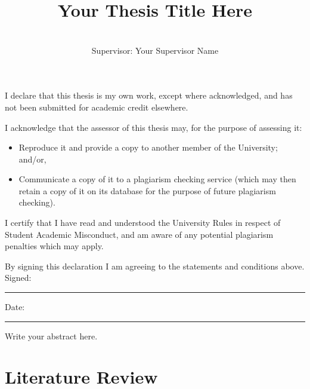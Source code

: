\documentclass[mstat,12pt]{unswthesis}
\title{Your Thesis Title Here}
\author{\Authornameonly\\{\bigskip}Supervisor: Your Supervisor Name}
\newcommand\blankpage{%
    \null
    \thispagestyle{empty}%
    \addtocounter{page}{-1}%
    \newpage}
\begin{document}
\beforepreface
\afterpage{\blankpage}


\vskip 10pc \noindent I declare that this thesis is my
own work, except where acknowledged, and has not been submitted for
academic credit elsewhere.

\vskip 2pc  \noindent I acknowledge that the assessor of this
thesis may, for the purpose of assessing it:
\begin{itemize}
    \item Reproduce it and provide a copy to another member of the University; and/or,
    \item Communicate a copy of it to a plagiarism checking service (which may then retain a copy of it on its database for the purpose of future plagiarism checking).
\end{itemize}

\vskip 2pc \noindent I certify that I have read and understood the University Rules in
respect of Student Academic Misconduct, and am aware of any potential plagiarism penalties which may
apply.\vspace{24pt}

\vskip 2pc \noindent By signing
this declaration I am
agreeing to the statements and conditions above.
\vskip 2pc \noindent
Signed: \rule{7cm}{0.25pt} \hfill Date: \rule{4cm}{0.25pt} \newline
\vskip 1pc

\afterpage{\blankpage}

Write your abstract here.
\afterpage{\blankpage}

\afterpreface

\afterpage{\blankpage}

\chapter{Literature Review}

\end{document}
